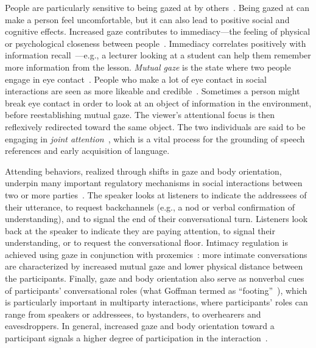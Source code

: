 People are particularly sensitive to being gazed at by others~\citep{argyle1976gaze}. Being gazed at can make a person feel uncomfortable, but it can also lead to positive social and cognitive effects. Increased gaze contributes to immediacy---the feeling of physical or psychological closeness between people~\citep{mehrabian1966immediacy}. Immediacy correlates positively with information recall~\citep{otteson1980effect,sherwood1987facilitative,fullwood2006effect,kelley1988effects}---e.g., a lecturer looking at a student can help them remember more information from the lesson.
\emph{Mutual gaze} is the state where two people engage in eye contact~\citep{argyle1976gaze}. People who make a lot of eye contact in social interactions are seen as more likeable and credible~\citep{beebe1976effects,argyle1976gaze}. Sometimes a person might break eye contact in order to look at an object of information in the environment, before reestablishing mutual gaze. The viewer's attentional focus is then reflexively redirected toward the same object. The two individuals are said to be engaging in \emph{joint attention}~\citep{moore2014joint}, which is a vital process for the grounding of speech references and early acquisition of language.

Attending behaviors, realized through shifts in gaze and body orientation, underpin many important regulatory mechanisms in social interactions between two or more parties~\citep{heylen2006head}. The speaker looks at listeners to indicate the addressees of their utterance, to request backchannels (e.g., a nod or verbal confirmation of understanding), and to signal the end of their conversational turn. Listeners look back at the speaker to indicate they are paying attention, to signal their understanding, or to request the conversational floor. Intimacy regulation is achieved using gaze in conjunction with proxemics~\citep{argyle1965eyecontact}: more intimate conversations are characterized by increased mutual gaze and lower physical distance between the participants. Finally, gaze and body orientation also serve as nonverbal cues of participants' conversational roles (what Goffman termed as ``footing''~\citep{goffman1979footing}), which is particularly important in multiparty interactions, where participants' roles can range from speakers or addressees, to bystanders, to overhearers and eavesdroppers. In general, increased gaze and body orientation toward a participant signals a higher degree of participation in the interaction~\citep{mutlu2012conversational}.

